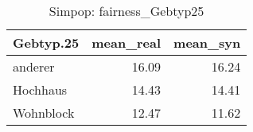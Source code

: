 \begin{table}[ht]
\centering
\begin{tabular}{lrr}
  \hline
Gebtyp.25 & mean\_real & mean\_syn \\ 
  \hline
anderer & 16.09 & 16.24 \\ 
  Hochhaus & 14.43 & 14.41 \\ 
  Wohnblock & 12.47 & 11.62 \\ 
   \hline
\end{tabular}
\caption{Simpop: fairness_Gebtyp25} 
\end{table}
